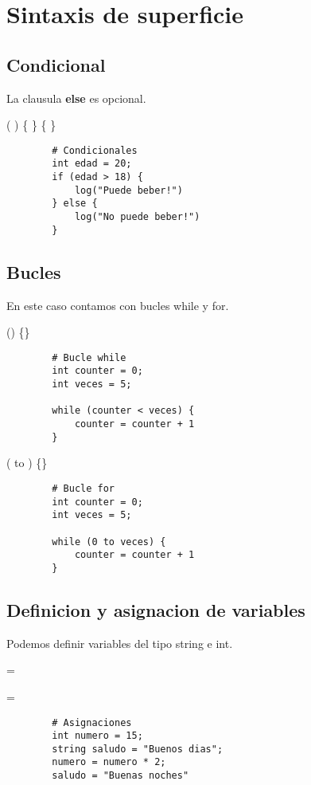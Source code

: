 \documentclass{article}
\begin{document}
    \section{Sintaxis de superficie}
    \subsection{Condicional}
    La clausula \textbf{else} es opcional. \par
    \begin{center}
         (  ) 
        \{  \}  \{  \}
    \end{center}
    \begin{lstlisting}
        # Condicionales
        int edad = 20;
        if (edad > 18) {
            log("Puede beber!")
        } else {
            log("No puede beber!")
        }
    \end{lstlisting}
    \subsection{Bucles}
    En este caso contamos con bucles while y for.\par
    \begin{center}
         () \{\}
    \end{center}
    \begin{lstlisting}
        # Bucle while
        int counter = 0;
        int veces = 5;
        
        while (counter < veces) {
            counter = counter + 1
        }

    \end{lstlisting}
    \begin{center}
         ( to ) \{\}
    \end{center}
    \begin{lstlisting}
        # Bucle for
        int counter = 0;
        int veces = 5;
        
        while (0 to veces) {
            counter = counter + 1
        }

    \end{lstlisting}
    \newpage
    \subsection{Definicion y asignacion de variables}
    Podemos definir variables del tipo string e int.\par
    \begin{center}
          = 
    \end{center}
    \begin{center}
          = 
    \end{center}
    \begin{lstlisting}
        # Asignaciones
        int numero = 15;
        string saludo = "Buenos dias";
        numero = numero * 2;
        saludo = "Buenas noches"
    \end{lstlisting}
\end{document}
